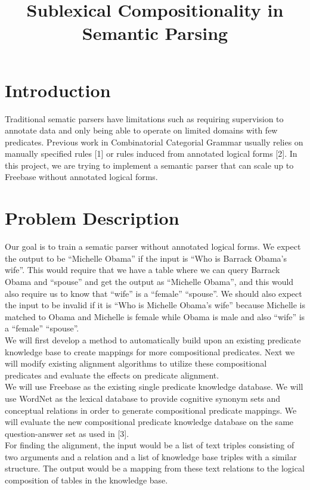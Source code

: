 \documentclass[12pt, a4paper]{article}
\title{Sublexical Compositionality in Semantic Parsing}
\begin{document}
\maketitle

\section{Introduction}
Traditional sematic parsers have limitations such as requiring supervision to annotate data and only being able to operate on limited domains with few predicates. Previous work in Combinatorial Categorial Grammar usually relies on manually specified rules [1] or rules induced from annotated logical forms [2]. In this project, we are trying to implement a semantic parser that can scale up to Freebase without annotated logical forms. 

\section{Problem Description}
Our goal is to train a sematic parser without annotated logical forms. We expect the output to be “Michelle Obama” if the input is “Who is Barrack Obama’s wife”. This would require that we have a table where we can query Barrack Obama and “spouse” and get the output as “Michelle Obama”, and this would also require us to know that “wife” is a “female” “spouse”. We should also expect the input to be invalid if it is “Who is Michelle Obama’s wife” because Michelle is matched to Obama and Michelle is female while Obama is male and also “wife” is a “female” “spouse”.\\

We will first develop a method to automatically build upon an existing predicate knowledge base to create mappings for more compositional predicates. Next we will modify existing alignment algorithms to utilize these compositional predicates and evaluate the effects on predicate alignment.\\

We will use Freebase as the existing single predicate knowledge database. We will use WordNet as the lexical database to provide cognitive synonym sets and conceptual relations in order to generate compositional predicate mappings. We will evaluate the new compositional predicate knowledge database on the same question-answer set as used in [3]. \\

For finding the alignment, the input would be a list of text triples consisting of two arguments and a relation and a list of knowledge base triples with a similar structure. The output would be a mapping from these text relations to the logical composition of tables in the knowledge base.
\end{document}
